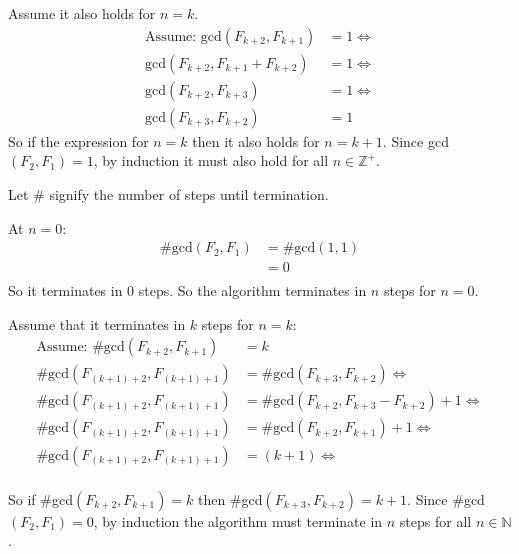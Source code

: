 \documentclass[10pt,\jkfside,a4paper]{article}
\begin{document}
\begin{enumerate}
\begin{enumerate}
Assume it also holds for $n = k$.
\begin{equation}
\begin{split}
\text{Assume: } \text{gcd}(F_{k + 2}, F_{k + 1}) &= 1 \Longleftrightarrow \\
\text{gcd}(F_{k + 2}, F_{k + 1} + F_{k + 2}) &= 1 \Longleftrightarrow \\
\text{gcd}(F_{k + 2}, F_{k + 3}) &= 1 \Longleftrightarrow \\
\text{gcd}(F_{k + 3}, F_{k + 2}) &= 1
\end{split}
\end{equation}
So if the expression for $n = k$ then it also holds for $n = k + 1$. Since 
gcd$(F_2, F_1) = 1$, by induction it must also hold for all $n \in \mathbb{Z}^+$.

Let \# signify the number of steps until termination.

At $n = 0$:
\begin{equation}
\begin{split}
\#\text{gcd}(F_2, F_1) &= \#\text{gcd}(1, 1)\\
					   &= 0\\
\end{split}
\end{equation}
So it terminates in 0 steps. So the algorithm terminates in $n$ steps for $n = 0$.

Assume that it terminates in $k$ steps for $n = k$:
\begin{equation}
\begin{split}
\text{Assume: } \#\text{gcd}(F_{k + 2}, F_{k + 1}) &= k\\
\#\text{gcd}(F_{(k + 1) + 2}, F_{(k + 1) + 1}) &= \#\text{gcd}(F_{k + 3}, F_{k + 2}) \Longleftrightarrow\\
\#\text{gcd}(F_{(k + 1) + 2}, F_{(k + 1) + 1}) &= \#\text{gcd}(F_{k + 2}, F_{k + 3} - F_{k + 2}) + 1\Longleftrightarrow\\
\#\text{gcd}(F_{(k + 1) + 2}, F_{(k + 1) + 1}) &= \#\text{gcd}(F_{k + 2}, F_{k + 1}) + 1\Longleftrightarrow\\
\#\text{gcd}(F_{(k + 1) + 2}, F_{(k + 1) + 1}) &= (k + 1) \Longleftrightarrow\\
\end{split}
\end{equation}

So if \#gcd$(F_{k + 2}, F_{k + 1}) = k$ then \#gcd$(F_{k + 3}, F_{k + 2}) = k + 1$.
Since \#gcd$(F_2, F_1) = 0$, by induction the algorithm must terminate in $n$ steps 
for all $n \in \mathbb{N}$.


\end{enumerate}
\end{enumerate}
\end{document}
